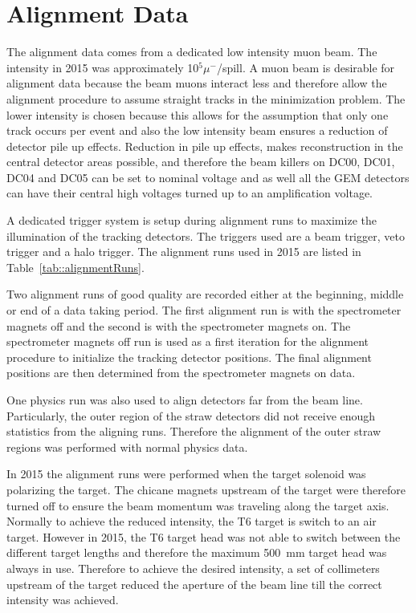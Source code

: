 \section{Alignment Data}

The alignment data comes from a dedicated low intensity muon beam.  The
intensity in 2015 was approximately 10$^5 \mu^-$/spill.  A muon beam is
desirable for alignment data because the beam muons interact less and therefore
allow the alignment procedure to assume straight tracks in the minimization
problem.  The lower intensity is chosen because this allows for the assumption
that only one track occurs per event and also the low intensity beam ensures a
reduction of detector pile up effects.  Reduction in pile up effects, makes
reconstruction in the central detector areas possible, and therefore the beam
killers on DC00, DC01, DC04 and DC05 can be set to nominal voltage and as well
all the GEM detectors can have their central high voltages turned up to an
amplification voltage.

A dedicated trigger system is setup during alignment runs to maximize the
illumination of the tracking detectors.  The triggers used are a beam trigger,
veto trigger and a halo trigger.  The alignment runs used in 2015 are listed in
Table~\ref{tab::alignmentRuns}. \par

Two alignment runs of good quality are recorded either at the beginning, middle
or end of a data taking period.  The first alignment run is with the
spectrometer magnets off and the second is with the spectrometer magnets on.
The spectrometer magnets off run is used as a first iteration for the alignment
procedure to initialize the tracking detector positions.  The final alignment
positions are then determined from the spectrometer magnets on data.

One physics run was also used to align detectors far from the beam line.  Particularly, the outer region of the straw detectors did not receive enough statistics from the aligning runs.  Therefore the alignment of the outer straw regions was performed with normal physics data. 

In 2015 the alignment runs were performed when the target solenoid was
polarizing the target.  The chicane magnets upstream of the target were
therefore turned off to ensure the beam momentum was traveling along the target
axis.  Normally to achieve the reduced intensity, the T6 target is switch to an
air target.  However in 2015, the T6 target head was not able to switch between
the different target lengths and therefore the maximum 500~mm target head was
always in use.  Therefore to achieve the desired intensity, a set of collimeters
upstream of the target reduced the aperture of the beam line till the correct
intensity was achieved.

